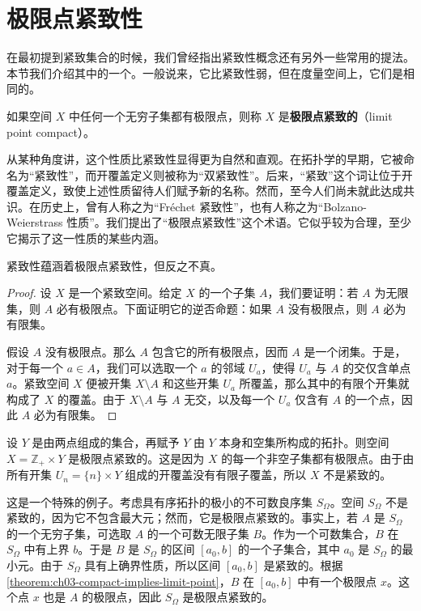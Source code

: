 \section{极限点紧致性}\label{section:ch03-limit-point-compact}

在最初提到紧致集合的时候，我们曾经指出紧致性概念还有另外一些常用的提法。本节我们介绍其中的一个。一般说来，它比紧致性弱，但在度量空间上，它们是相同的。

\begin{definition}\label{definition:ch03-limit-point-compact}
如果空间 $X$ 中任何一个无穷子集都有极限点，则称 $X$ 是\textbf{极限点紧致的}（limit point compact）。
\end{definition}

从某种角度讲，这个性质比紧致性显得更为自然和直观。在拓扑学的早期，它被命名为``紧致性''，而开覆盖定义则被称为``双紧致性''。后来，``紧致''这个词让位于开覆盖定义，致使上述性质留待人们赋予新的名称。然而，至今人们尚未就此达成共识。在历史上，曾有人称之为``Fréchet 紧致性''，也有人称之为``Bolzano-Weierstrass 性质''。我们提出了``极限点紧致性''这个术语。它似乎较为合理，至少它揭示了这一性质的某些内涵。

\begin{theorem}\label{theorem:ch03-compact-implies-limit-point}
紧致性蕴涵着极限点紧致性，但反之不真。
\end{theorem}

\begin{proof}
设 $X$ 是一个紧致空间。给定 $X$ 的一个子集 $A$，我们要证明：若 $A$ 为无限集，则 $A$ 必有极限点。下面证明它的逆否命题：如果 $A$ 没有极限点，则 $A$ 必为有限集。

假设 $A$ 没有极限点。那么 $A$ 包含它的所有极限点，因而 $A$ 是一个闭集。于是，对于每一个 $a\in A$，我们可以选取一个 $a$ 的邻域 $U_{a}$，使得 $U_{a}$ 与 $A$ 的交仅含单点 $a$。紧致空间 $X$ 便被开集 $X\setminus A$ 和这些开集 $U_{a}$ 所覆盖，那么其中的有限个开集就构成了 $X$ 的覆盖。由于 $X\setminus A$ 与 $A$ 无交，以及每一个 $U_{a}$ 仅含有 $A$ 的一个点，因此 $A$ 必为有限集。
\end{proof}

\begin{example}\label{example:ch03-two-point-limit-compact}
设 $Y$ 是由两点组成的集合，再赋予 $Y$ 由 $Y$ 本身和空集所构成的拓扑。则空间 $X=\mathbb{Z}_{+}\times Y$ 是极限点紧致的。这是因为 $X$ 的每一个非空子集都有极限点。由于由所有开集 $U_{n}=\{n\}\times Y$ 组成的开覆盖没有有限子覆盖，所以 $X$ 不是紧致的。
\end{example}

\begin{example}\label{example:ch03-somega-limit-compact}
这是一个特殊的例子。考虑具有序拓扑的极小的不可数良序集 $S_{\Omega}$。空间 $S_{\Omega}$ 不是紧致的，因为它不包含最大元；然而，它是极限点紧致的。事实上，若 $A$ 是 $S_{\Omega}$ 的一个无穷子集，可选取 $A$ 的一个可数无限子集 $B$。作为一个可数集合，$B$ 在 $S_{\Omega}$ 中有上界 $b$。于是 $B$ 是 $S_{\Omega}$ 的区间 $[a_{0},b]$ 的一个子集合，其中 $a_{0}$ 是 $S_{\Omega}$ 的最小元。由于 $S_{\Omega}$ 具有上确界性质，所以区间 $[a_{0},b]$ 是紧致的。根据\cref{theorem:ch03-compact-implies-limit-point}，$B$ 在 $[a_{0},b]$ 中有一个极限点 $x$。这个点 $x$ 也是 $A$ 的极限点，因此 $S_{\Omega}$ 是极限点紧致的。
\end{example}

